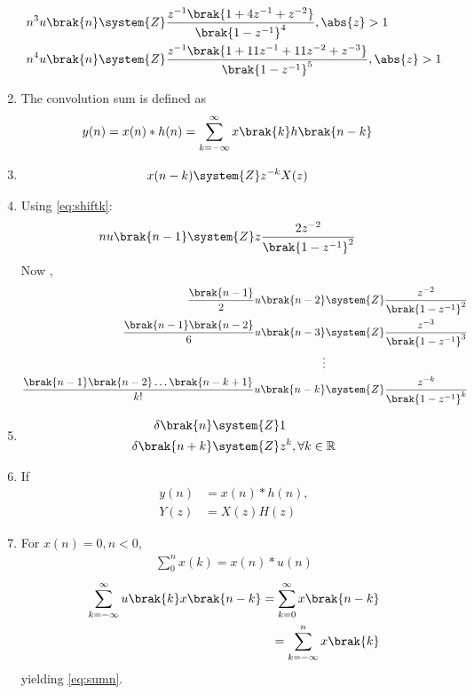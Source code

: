 \begin{enumerate}[label=\thesubsection.\arabic*,ref=\thesubsection.\theenumi]
\begin{align}
         n^3 u\brak{n} & \system{Z} \frac{z^{-1}\brak{1+4z^{-1}+z^{-2}}}{\brak{1-z^{-1}}^4} ,   \abs{z} >1\label{eq:11.9.5.26.4} \\
       n^4 u\brak{n} & \system{Z} \frac{z^{-1}\brak{1+11z^{-1}+11z^{-2}+z^{-3}}}{\brak{1-z^{-1}}^5},\abs{z}>1
	\label{eq:11.9.5.26.5}  
\end{align} 
\item The convolution sum is defined as
\begin{align}
	y(n) &= x(n)* h(n) = \sum_{k=-\infty}^{\infty}x\brak{k}h\brak{n-k}
	\label{eq:conv}
\end{align}
\item 
\begin{align}
	x(n-k) &\system{Z} z^{-k}X(z)
\label{eq:shiftk}
\end{align}
\item Using \eqref{eq:shiftk}:
 \begin{align}
         nu\brak{n-1}&\system{Z} z\frac{2z^{-2}}{\brak{1-z^{-1}}^2}
    \end{align}
 Now , 
    \begin{align}
         \frac{\brak{n-1}}{2}u\brak{n-2} & \system{Z} \frac{z^{-2}}{\brak{1-z^{-1}}^2} \\
         \frac{\brak{n-1}\brak{n-2}}{6}u\brak{n-3}&\system{Z} \frac{z^{-3}}{\brak{1-z^{-1}}^3}\\
         \vdots \notag \\
          \frac{\brak{n-1}\brak{n-2}\ldots \brak{n-k+1}}{k!}u\brak{n-k}&\system{Z} \frac{z^{-k}}{\brak{1-z^{-1}}^k}
	  \label{eq:11.9.5.26.8}
    \end{align}
\item
\begin{align}
	\delta\brak{n} &\system{Z} 1 \\
	\delta\brak{n+k} &\system{Z}z^{k} ,\forall k\in \mathbb{R} \label{11027_delta_func}
\end{align}
\item If 
\begin{align}
	y(n) &= x(n)*h(n),
	\\
	Y(z)&=X(z)H(z)
\label{eq:prodz}
\end{align}
\item For 
$x(n) = 0, n < 0$,
	\begin{align}
	\sum_{0}^{n}x(k) = x(n)*u(n)
	\label{eq:sumn}
	\end{align}
	\solution 
\begin{align}
	  \sum_{k=-\infty}^{\infty}u\brak{k}x\brak{n-k}
	 = \sum_{k=0}^{\infty}x\brak{n-k}
	 \\
	 = \sum_{k=-\infty}^{n}x\brak{k}
\end{align}
yielding 
	\eqref{eq:sumn}.
\end{enumerate}
